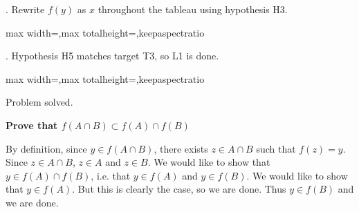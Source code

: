 \documentclass[a4paper,twoside,12pt]{article} %
\makeatletter
\DeclareRobustCommand{\_}{%
  \leavevmode\vbox{%
    \hrule\@width.4em
          \@height-.16ex
          \@depth\dimexpr.16ex+.28pt\relax}}
\newcommand\Tstrut{\rule{0pt}{2.4ex}}
\newcommand\Bstrut{\rule[-1.1ex]{0pt}{0pt}}
\newenvironment{fit}{\begin{adjustbox}{max width=\textwidth,max totalheight=\textheight,keepaspectratio}}{\end{adjustbox}}
\makeatother
\begin{document}
\begin{steps}
. Rewrite $f(y)$ as $x$ throughout the tableau using hypothesis H3.\nopagebreak[4] 
\nopagebreak[4] 
\smallskip\nopagebreak[4] 

\begin{fit}%
\end{fit}
\smallskip

. Hypothesis H5 matches target T3, so L1 is done.\nopagebreak[4] 
\nopagebreak[4] 
\smallskip\nopagebreak[4] 

\begin{fit}%
\end{fit}

Problem solved.
\cleardoublepage

\end{steps}
{\begin{center} \large \textbf{Prove that $f(A \cap B) \subset f(A) \cap f(B)$}\end{center}}\nopagebreak[4]

\begin{center}
\begin{minipage}{120mm}
By definition, since $y\in f(A\cap B)$, there exists $z\in A\cap B$ such that $f(z) = y$. Since $z\in A\cap B$, $z\in A$ and $z\in B$. We would like to show that $y\in f(A)\cap f(B)$, i.e. that $y\in f(A)$ and $y\in f(B)$. We would like to show that $y\in f(A)$. But this is clearly the case, so we are done. Thus $y\in f(B)$ and we are done.
\end{minipage}
\end{center}
\end{document}
